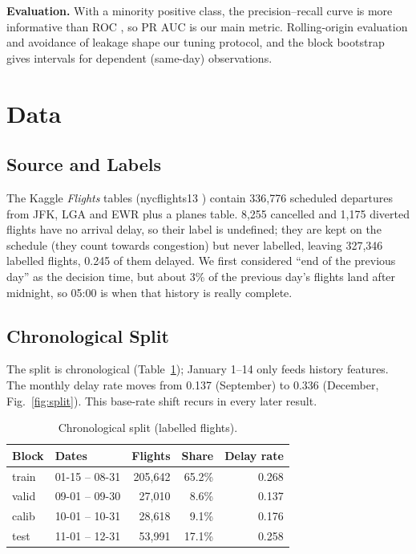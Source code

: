 \documentclass[conference]{IEEEtran}
\begin{document}
\textbf{Evaluation.} With a minority positive class, the precision--recall curve is more informative than ROC \cite{saito2015}, so PR AUC is our main metric. Rolling-origin evaluation \cite{tashman2000} and avoidance of leakage \cite{kaufman2012} shape our tuning protocol, and the block bootstrap \cite{kunsch1989} gives intervals for dependent (same-day) observations.

\section{Data}
\subsection{Source and Labels}
The Kaggle \emph{Flights} tables (nycflights13 \cite{wickham2013}) contain 336,776 scheduled departures from JFK, LGA and EWR plus a planes table. 8,255 cancelled and 1,175 diverted flights have no arrival delay, so their label is undefined; they are kept on the schedule (they count towards congestion) but never labelled, leaving 327,346 labelled flights, 0.245 of them delayed. We first considered ``end of the previous day'' as the decision time, but about 3\% of the previous day's flights land after midnight, so 05:00 is when that history is really complete.

\subsection{Chronological Split}
The split is chronological (Table~\ref{tab:split}); January 1--14 only feeds history features. The monthly delay rate moves from 0.137 (September) to 0.336 (December, Fig.~\ref{fig:split}). This base-rate shift recurs in every later result.

\begin{table}[t]\centering\caption{Chronological split (labelled flights).}\label{tab:split}
\footnotesize\begin{tabular}{llrrr}\toprule
Block & Dates & Flights & Share & Delay rate\\\midrule
train & 01-15 -- 08-31 & 205,642 & 65.2\% & 0.268\\
valid & 09-01 -- 09-30 & 27,010 & 8.6\% & 0.137\\
calib & 10-01 -- 10-31 & 28,618 & 9.1\% & 0.176\\
test & 11-01 -- 12-31 & 53,991 & 17.1\% & 0.258\\
\bottomrule\end{tabular}\end{table}
\end{document}
